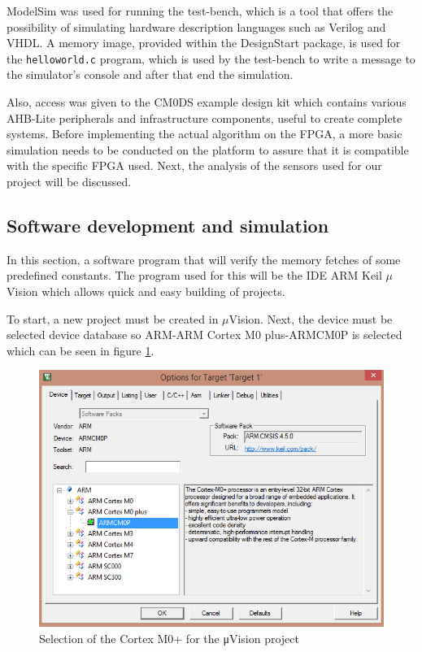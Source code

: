 ModelSim was used for running the test-bench, which is a tool that offers the possibility of simulating hardware description languages such as Verilog and VHDL.  A memory image, provided within the DesignStart package, is used for the \verb|helloworld.c| program, which is used by the test-bench to write a message to the simulator's console and after that end the simulation. 

Also, access was given to the CM0DS example design kit which contains various AHB-Lite peripherals and infrastructure components, useful to create complete systems. Before implementing the actual algorithm on the FPGA, a more basic simulation needs to be conducted on the platform to assure that it is compatible with the specific FPGA used. Next, the analysis of the sensors used for our project will be discussed. 


\subsection{Software development and simulation}
In this section, a software program that will verify the memory fetches of some predefined constants. The program used for this will be the IDE ARM Keil $\mu$Vision which allows quick and easy building of projects.

To start, a new project must be created in $\mu$Vision. Next, the device must be selected device database so ARM-ARM Cortex M0 plus-ARMCM0P is selected which can be seen in figure \ref{fig:armcm0p}.

\begin{figure}
\centering
\includegraphics[scale=0.7]{figures/armcm0p.PNG}
\caption{Selection of the Cortex M0+ for the μVision project} 
\label{fig:armcm0p}
\end{figure}

